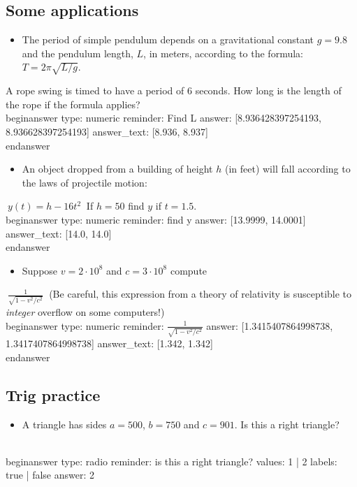 \documentclass[12pt]{article}
\begin{document}
\subsection{Some applications}\begin{itemize}\item The period of simple pendulum depends on a gravitational constant   $g=9.8$ and the pendulum length, $L$, in meters, according to the formula:   $T=2\pi\sqrt{L/g}$.\end{itemize}\newline
A rope swing is timed to have a period of $6$ seconds. How long is   the length of the rope if the formula applies?
\\begin{answer}
    type: numeric
    reminder: Find L
    answer: [8.936428397254193, 8.936628397254193]
    answer_text: [8.936, 8.937] 
\\end{answer}
\begin{itemize}\item An object dropped from a building of height $h$ (in feet) will fall   according to the laws of projectile motion:\end{itemize}$~
y(t) = h - 16t^2
~$\newline
If $h=50$ find $y$ if $t=1.5$.
\\begin{answer}
    type: numeric
    reminder: find y
    answer: [13.9999, 14.0001]
    answer_text: [14.0, 14.0] 
\\end{answer}
\begin{itemize}\item Suppose $v = 2\cdot 10^8$ and $c = 3 \cdot 10^8$ compute\end{itemize}$~
\frac{1}{\sqrt{1 - v^2/c^2}}
~$\newline
(Be careful, this expression from a theory of relativity is susceptible to \textit{integer} overflow on some computers!)
\\begin{answer}
    type: numeric
    reminder: \( \frac{1}{\sqrt{1 - v^2/c^2}} \)
    answer: [1.3415407864998738, 1.3417407864998738]
    answer_text: [1.342, 1.342] 
\\end{answer}
\subsection{Trig practice}\begin{itemize}\item A triangle has sides $a=500$, $b=750$ and $c=901$. Is this a right triangle?\end{itemize}
\\begin{answer}
type: radio
reminder: is this a right triangle?
values: 1 | 2
labels: true | false
answer: 2
\end{document}

